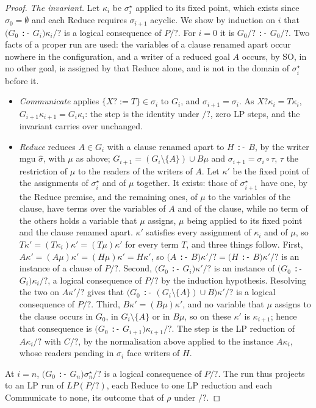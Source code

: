 \begin{proof}
\emph{The invariant.} Let $\kappa_i$ be $\sigma_i^\star$ applied to its fixed point, which exists since $\sigma_0 = \emptyset$ and each Reduce requires $\sigma_{i+1}$ acyclic. We show by induction on $i$ that $(G_0$ \texttt{:-} $G_i)\kappa_i/?$ is a logical consequence of $P/?$. For $i = 0$ it is $G_0/?$ \texttt{:-} $G_0/?$. Two facts of a proper run are used: the variables of a clause renamed apart occur nowhere in the configuration, and a writer of a reduced goal $A$ occurs, by SO, in no other goal, is assigned by that Reduce alone, and is not in the domain of $\sigma_i^\star$ before it.
\begin{itemize}
    \item \emph{Communicate} applies $\{X? := T\} \in \sigma_i$ to $G_i$, and $\sigma_{i+1} = \sigma_i$. As $X?\kappa_i = T\kappa_i$, $G_{i+1}\kappa_{i+1} = G_i\kappa_i$: the step is the identity under $/?$, zero LP steps, and the invariant carries over unchanged.
    \item \emph{Reduce} reduces $A \in G_i$ with a clause renamed apart to $H$ \texttt{:-} $B$, by the writer mgu $\hat\sigma$, with $\mu$ as above; $G_{i+1} = (G_i \setminus \{A\}) \cup B\mu$ and $\sigma_{i+1} = \sigma_i \circ \tau$, $\tau$ the restriction of $\mu$ to the readers of the writers of $A$. Let $\kappa'$ be the fixed point of the assignments of $\sigma_i^\star$ and of $\mu$ together. It exists: those of $\sigma_{i+1}^\star$ have one, by the Reduce premise, and the remaining ones, of $\mu$ to the variables of the clause, have terms over the variables of $A$ and of the clause, while no term of the others holds a variable that $\mu$ assigns, $\mu$ being applied to its fixed point and the clause renamed apart. $\kappa'$ satisfies every assignment of $\kappa_i$ and of $\mu$, so $T\kappa' = (T\kappa_i)\kappa' = (T\mu)\kappa'$ for every term $T$, and three things follow. First, $A\kappa' = (A\mu)\kappa' = (H\mu)\kappa' = H\kappa'$, so $(A$ \texttt{:-} $B)\kappa'/? = (H$ \texttt{:-} $B)\kappa'/?$ is an instance of a clause of $P/?$. Second, $(G_0$ \texttt{:-} $G_i)\kappa'/?$ is an instance of $(G_0$ \texttt{:-} $G_i)\kappa_i/?$, a logical consequence of $P/?$ by the induction hypothesis. Resolving the two on $A\kappa'/?$ gives that $(G_0$ \texttt{:-} $(G_i \setminus \{A\}) \cup B)\kappa'/?$ is a logical consequence of $P/?$. Third, $B\kappa' = (B\mu)\kappa'$, and no variable that $\mu$ assigns to the clause occurs in $G_0$, in $G_i \setminus \{A\}$ or in $B\mu$, so on these $\kappa'$ is $\kappa_{i+1}$; hence that consequence is $(G_0$ \texttt{:-} $G_{i+1})\kappa_{i+1}/?$. The step is the LP reduction of $A\kappa_i/?$ with $C/?$, by the normalisation above applied to the instance $A\kappa_i$, whose readers pending in $\sigma_i$ face writers of $H$.
\end{itemize}
At $i = n$, $(G_0$ \texttt{:-} $G_n)\sigma_n^\star/?$ is a logical consequence of $P/?$. The run thus projects to an LP run of $LP(P/?)$, each Reduce to one LP reduction and each Communicate to none, its outcome that of $\rho$ under $/?$.
\end{proof}

